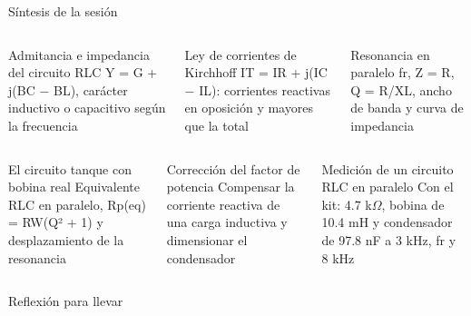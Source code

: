 \documentclass[aspectratio=169,11pt,xcolor={table}]{beamer}
\begin{document}
\begin{frame}{Síntesis de la sesión}
\begin{columns}[T,onlytextwidth]
\begin{cardB}{Admitancia e impedancia del circuito RLC}
\scriptsize Y = G + j(BC \ensuremath{-} BL), carácter inductivo o capacitivo según la frecuencia
\end{cardB}
\begin{cardO}{Ley de corrientes de Kirchhoff}
\scriptsize IT = IR + j(IC \ensuremath{-} IL): corrientes reactivas en oposición y mayores que la total
\end{cardO}
\begin{cardG}{Resonancia en paralelo}
\scriptsize fr, Z = R, Q = R/XL, ancho de banda y curva de impedancia
\end{cardG}
\end{columns}
\vspace{2mm}
\begin{columns}[T,onlytextwidth]
\begin{cardB}{El circuito tanque con bobina real}
\scriptsize Equivalente RLC en paralelo, Rp(eq) = RW(Q² + 1) y desplazamiento de la resonancia
\end{cardB}
\begin{cardO}{Corrección del factor de potencia}
\scriptsize Compensar la corriente reactiva de una carga inductiva y dimensionar el condensador
\end{cardO}
\begin{cardG}{Medición de un circuito RLC en paralelo}
\scriptsize Con el kit: 4.7 k\ensuremath{\Omega}, bobina de 10.4 mH y condensador de 97.8 nF a 3 kHz, fr y 8 kHz
\end{cardG}
\end{columns}
\end{frame}

\begin{frame}{Reflexión para llevar}
\centering
{}
\end{frame}
\end{document}
